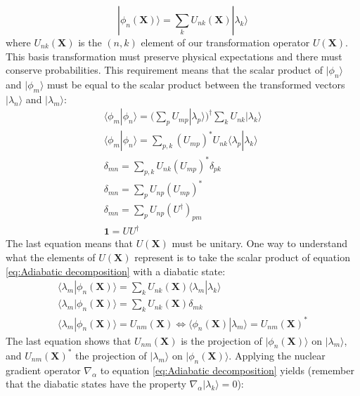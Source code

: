 \documentclass[11pt,a4paper]{article}
\begin{document}
\begin{equation}
	\label{eq:Adiabatic decomposition}
	|\phi_n(\mathbf{X})\rangle = \sum_k U_{nk}(\mathbf{X})|\lambda_k\rangle
\end{equation}
where $U_{nk}(\mathbf{X})$ is the $(n,k)$ element of our transformation operator $U(\mathbf{X})$. This basis transformation must preserve physical expectations and there must conserve probabilities. This requirement means that the scalar product of $| \phi_n \rangle$ and $| \phi_m \rangle$ must be equal to the scalar product between the transformed vectors $| \lambda_n \rangle$ and $| \lambda_m \rangle$:
\begin{equation*}
	\begin{gathered}
		\langle\phi_m|\phi_n\rangle = \Big(\sum_p U_{mp}|\lambda_p\rangle\Big)^{\dagger} \sum_k U_{nk}|\lambda_k\rangle \\
		\langle\phi_m|\phi_n\rangle = \sum_{p,k} (U_{mp})^{*}U_{nk}\langle\lambda_p|\lambda_k\rangle \\
		\delta_{mn} = \sum_{p,k} U_{nk}(U_{mp})^{*}\delta_{pk} \\
		\delta_{mn} = \sum_p U_{np}(U_{mp})^{*} \\
		\delta_{mn} = \sum_p U_{np}(U^{\dagger})_{pm} \\
		\mathbf{1} = UU^{\dagger}
	\end{gathered}
\end{equation*}
The last equation means that $U(\mathbf{X})$ must be unitary. One way to understand what the elements of $U(\mathbf{X})$ represent is to take the scalar product of equation \eqref{eq:Adiabatic decomposition} with a diabatic state:
\begin{equation*}
	\begin{gathered}
		\langle\lambda_m|\phi_n(\mathbf{X})\rangle = \sum_k U_{nk}(\mathbf{X})\langle\lambda_m|\lambda_k\rangle \\
		\langle\lambda_m|\phi_n(\mathbf{X})\rangle = \sum_k U_{nk}(\mathbf{X})\delta_{mk} \\
		\langle\lambda_m|\phi_n(\mathbf{X})\rangle = U_{nm}(\mathbf{X}) \Leftrightarrow \langle\phi_n(\mathbf{X})|\lambda_m\rangle = U_{nm}(\mathbf{X})^{*}
	\end{gathered}
\end{equation*}
The last equation shows that $U_{nm}(\mathbf{X})$ is the projection of $|\phi_n(\mathbf{X})\rangle$ on $|\lambda_m\rangle$, and $U_{nm}(\mathbf{X})^{*}$ the projection of $|\lambda_m\rangle$ on $|\phi_n(\mathbf{X})\rangle$.
Applying the nuclear gradient operator $\nabla_{\alpha}$ to equation \eqref{eq:Adiabatic decomposition} yields (remember that the diabatic states have the property $\nabla_{\alpha}|\lambda_k\rangle = 0$):
\end{document}
